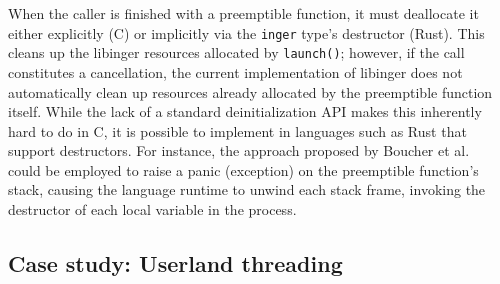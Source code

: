 When the caller is finished with a preemptible function, it must deallocate it either
explicitly (C) or implicitly via the \texttt{inger} type's destructor (Rust).  This
cleans up the libinger resources allocated by \texttt{launch()}; however, if the call
constitutes a cancellation, the current implementation of libinger does not
automatically clean up resources already allocated by the preemptible function
itself.  While the lack of a standard deinitialization API makes this inherently hard
to do in C, it is possible to implement in languages such as Rust that support
destructors.  For instance, the approach proposed by Boucher et
al.~\cite{boucher:atc2018} could be employed to raise a panic (exception) on the
preemptible function's stack, causing the language runtime to unwind each stack frame,
invoking the destructor of each local variable in the process.

\subsection{Case study: Userland threading}
\label{sec:threading}
